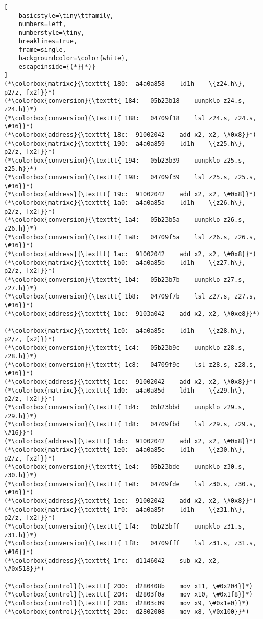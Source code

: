\documentclass[a4paper,10pt]{article}
\begin{document}
\begin{lstlisting}[
    basicstyle=\tiny\ttfamily,
    numbers=left,
    numberstyle=\tiny,
    breaklines=true,
    frame=single,
    backgroundcolor=\color{white},
    escapeinside={(*}{*)}
]
(*\colorbox{matrixc}{\texttt{ 180:	a4a0a858 	ld1h	\{z24.h\}, p2/z, [x2]}}*)
(*\colorbox{conversion}{\texttt{ 184:	05b23b18 	uunpklo	z24.s, z24.h}}*)
(*\colorbox{conversion}{\texttt{ 188:	04709f18 	lsl	z24.s, z24.s, \#16}}*)
(*\colorbox{address}{\texttt{ 18c:	91002042 	add	x2, x2, \#0x8}}*)
(*\colorbox{matrixc}{\texttt{ 190:	a4a0a859 	ld1h	\{z25.h\}, p2/z, [x2]}}*)
(*\colorbox{conversion}{\texttt{ 194:	05b23b39 	uunpklo	z25.s, z25.h}}*)
(*\colorbox{conversion}{\texttt{ 198:	04709f39 	lsl	z25.s, z25.s, \#16}}*)
(*\colorbox{address}{\texttt{ 19c:	91002042 	add	x2, x2, \#0x8}}*)
(*\colorbox{matrixc}{\texttt{ 1a0:	a4a0a85a 	ld1h	\{z26.h\}, p2/z, [x2]}}*)
(*\colorbox{conversion}{\texttt{ 1a4:	05b23b5a 	uunpklo	z26.s, z26.h}}*)
(*\colorbox{conversion}{\texttt{ 1a8:	04709f5a 	lsl	z26.s, z26.s, \#16}}*)
(*\colorbox{address}{\texttt{ 1ac:	91002042 	add	x2, x2, \#0x8}}*)
(*\colorbox{matrixc}{\texttt{ 1b0:	a4a0a85b 	ld1h	\{z27.h\}, p2/z, [x2]}}*)
(*\colorbox{conversion}{\texttt{ 1b4:	05b23b7b 	uunpklo	z27.s, z27.h}}*)
(*\colorbox{conversion}{\texttt{ 1b8:	04709f7b 	lsl	z27.s, z27.s, \#16}}*)
(*\colorbox{address}{\texttt{ 1bc:	9103a042 	add	x2, x2, \#0xe8}}*)

(*\colorbox{matrixc}{\texttt{ 1c0:	a4a0a85c 	ld1h	\{z28.h\}, p2/z, [x2]}}*)
(*\colorbox{conversion}{\texttt{ 1c4:	05b23b9c 	uunpklo	z28.s, z28.h}}*)
(*\colorbox{conversion}{\texttt{ 1c8:	04709f9c 	lsl	z28.s, z28.s, \#16}}*)
(*\colorbox{address}{\texttt{ 1cc:	91002042 	add	x2, x2, \#0x8}}*)
(*\colorbox{matrixc}{\texttt{ 1d0:	a4a0a85d 	ld1h	\{z29.h\}, p2/z, [x2]}}*)
(*\colorbox{conversion}{\texttt{ 1d4:	05b23bbd 	uunpklo	z29.s, z29.h}}*)
(*\colorbox{conversion}{\texttt{ 1d8:	04709fbd 	lsl	z29.s, z29.s, \#16}}*)
(*\colorbox{address}{\texttt{ 1dc:	91002042 	add	x2, x2, \#0x8}}*)
(*\colorbox{matrixc}{\texttt{ 1e0:	a4a0a85e 	ld1h	\{z30.h\}, p2/z, [x2]}}*)
(*\colorbox{conversion}{\texttt{ 1e4:	05b23bde 	uunpklo	z30.s, z30.h}}*)
(*\colorbox{conversion}{\texttt{ 1e8:	04709fde 	lsl	z30.s, z30.s, \#16}}*)
(*\colorbox{address}{\texttt{ 1ec:	91002042 	add	x2, x2, \#0x8}}*)
(*\colorbox{matrixc}{\texttt{ 1f0:	a4a0a85f 	ld1h	\{z31.h\}, p2/z, [x2]}}*)
(*\colorbox{conversion}{\texttt{ 1f4:	05b23bff 	uunpklo	z31.s, z31.h}}*)
(*\colorbox{conversion}{\texttt{ 1f8:	04709fff 	lsl	z31.s, z31.s, \#16}}*)
(*\colorbox{address}{\texttt{ 1fc:	d1146042 	sub	x2, x2, \#0x518}}*)

(*\colorbox{control}{\texttt{ 200:	d280408b 	mov	x11, \#0x204}}*)
(*\colorbox{control}{\texttt{ 204:	d2803f0a 	mov	x10, \#0x1f8}}*)
(*\colorbox{control}{\texttt{ 208:	d2803c09 	mov	x9, \#0x1e0}}*)
(*\colorbox{control}{\texttt{ 20c:	d2802008 	mov	x8, \#0x100}}*)


\end{lstlisting}
\end{document}
